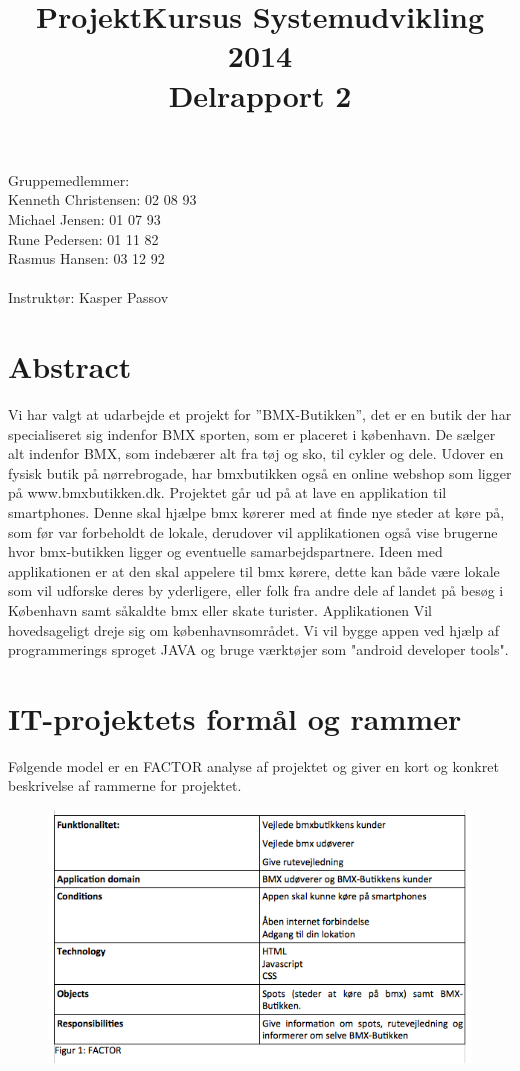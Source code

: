 \documentclass[12pt]{article}
\title{ProjektKursus Systemudvikling 2014\\Delrapport 2}
\author{}
\begin{document}
\maketitle
Gruppemedlemmer:\\
Kenneth Christensen: 02 08 93\\Michael Jensen: 01 07 93\\Rune Pedersen: 01 11 82\\Rasmus Hansen: 03 12 92
\\\\
Instruktør: Kasper Passov

\pagebreak
\section{Abstract}
Vi har valgt at udarbejde et projekt for  ”BMX-Butikken”, det er en butik der har specialiseret sig indenfor BMX sporten, som er placeret i københavn.  De sælger alt indenfor BMX, som indebærer alt fra tøj og sko, til cykler og dele. Udover en fysisk butik på nørrebrogade, har bmxbutikken også en online webshop som ligger på www.bmxbutikken.dk.
Projektet går ud på at lave en applikation til smartphones. Denne skal hjælpe bmx kørerer med at finde nye steder at køre på, som før var forbeholdt de lokale, derudover vil applikationen også vise  brugerne hvor bmx-butikken ligger og eventuelle samarbejdspartnere.
Ideen med applikationen er at den skal appelere til bmx kørere, dette kan både være lokale som vil udforske deres by yderligere, eller folk fra andre dele af landet på besøg i København samt såkaldte bmx eller skate turister. Applikationen Vil hovedsageligt dreje sig om københavnsområdet.
Vi vil bygge appen ved hjælp af programmerings sproget JAVA og bruge værktøjer som "android developer tools".

\section{IT-projektets formål og rammer}
Følgende model er en FACTOR analyse af projektet og giver en kort og konkret beskrivelse af rammerne for projektet.
\begin{figure}[h]
    \includegraphics[scale=0.5]{factor.png}
\end{figure}
\end{document}
